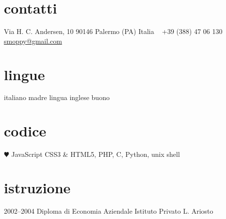 \documentclass[]{friggeri-cv} %
\begin{document}


\begin{aside} %
\section{contatti}
Via H. C. Andersen, 10
90146 Palermo (PA)
Italia
~
+39 (388) 47 06 130
~
\href{mailto:smoppy@gmail.com}{smoppy@gmail.com}
\section{lingue}
italiano madre lingua
inglese buono
\section{codice}
{\color{red} $\varheartsuit$} JavaScript
CSS3 \& HTML5,
PHP, C, Python, unix shell
\end{aside}

\section{istruzione}
\begin{entrylist}
\entry
{2002--2004}
{Diploma {\normalfont di Economia Aziendale}}
{Istituto Privato L. Ariosto}
{}
\end{entrylist}

\end{document}
